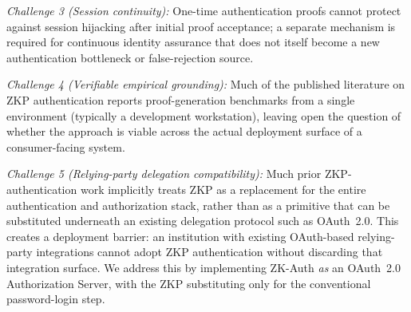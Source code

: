 \documentclass[journal,twoside,10pt]{IEEEtran}
\begin{document}
\textit{Challenge 3 (Session continuity):} One-time authentication proofs
cannot protect against session hijacking after initial proof acceptance;
a separate mechanism is required for continuous identity assurance that does
not itself become a new authentication bottleneck or false-rejection source.

\textit{Challenge 4 (Verifiable empirical grounding):} Much of the published
literature on ZKP authentication reports proof-generation benchmarks from a
single environment (typically a development workstation), leaving open the
question of whether the approach is viable across the actual deployment
surface of a consumer-facing system.

\textit{Challenge 5 (Relying-party delegation compatibility):} Much prior
ZKP-authentication work implicitly treats ZKP as a replacement for the
entire authentication and authorization stack, rather than as a primitive
that can be substituted underneath an existing delegation protocol such as
OAuth~2.0. This creates a deployment barrier: an institution with existing
OAuth-based relying-party integrations cannot adopt ZKP authentication
without discarding that integration surface. We address this by
implementing ZK-Auth \textit{as} an OAuth~2.0 Authorization Server, with
the ZKP substituting only for the conventional password-login step.
\end{document}
